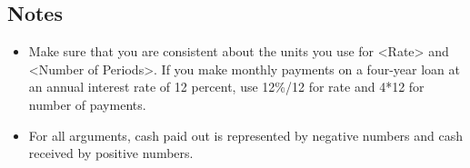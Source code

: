\documentclass[handout,space,nooutcomes]{ximera}
\begin{document}
\subsection*{Notes}
\begin{itemize}
\item Make sure that you are consistent about the units you use for <Rate> and <Number of Periods>. If you make monthly payments on a four-year loan at an annual interest rate of 12 percent, use 12\%/12 for rate and 4*12 for number of payments.

\item For all arguments, cash paid out is represented by negative numbers and cash received by positive numbers.
\end{itemize}
\end{document}
